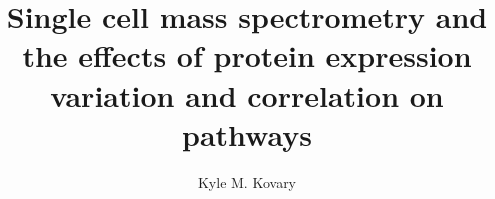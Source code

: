 \documentclass[12pt]{report}
\begin{document}
\title{Single cell mass spectrometry and the effects of protein expression variation and correlation on pathways}
\author{Kyle M. Kovary}
 

\beforepreface


\afterpreface



% 



\onlinesignature
\end{document}
